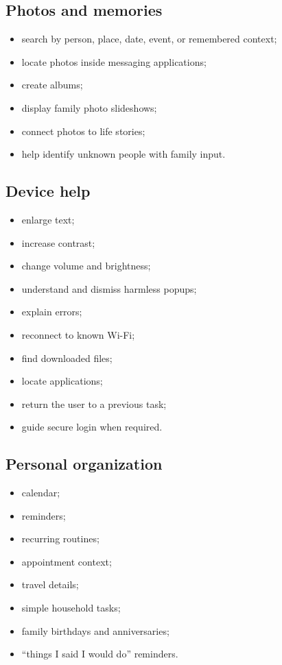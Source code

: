 \documentclass[11pt]{article}
\begin{document}
\subsection{Photos and memories}
\begin{itemize}[leftmargin=*]
    \item search by person, place, date, event, or remembered context;
    \item locate photos inside messaging applications;
    \item create albums;
    \item display family photo slideshows;
    \item connect photos to life stories;
    \item help identify unknown people with family input.
\end{itemize}

\subsection{Device help}
\begin{itemize}[leftmargin=*]
    \item enlarge text;
    \item increase contrast;
    \item change volume and brightness;
    \item understand and dismiss harmless popups;
    \item explain errors;
    \item reconnect to known Wi-Fi;
    \item find downloaded files;
    \item locate applications;
    \item return the user to a previous task;
    \item guide secure login when required.
\end{itemize}

\subsection{Personal organization}
\begin{itemize}[leftmargin=*]
    \item calendar;
    \item reminders;
    \item recurring routines;
    \item appointment context;
    \item travel details;
    \item simple household tasks;
    \item family birthdays and anniversaries;
    \item ``things I said I would do'' reminders.
\end{itemize}
\end{document}
